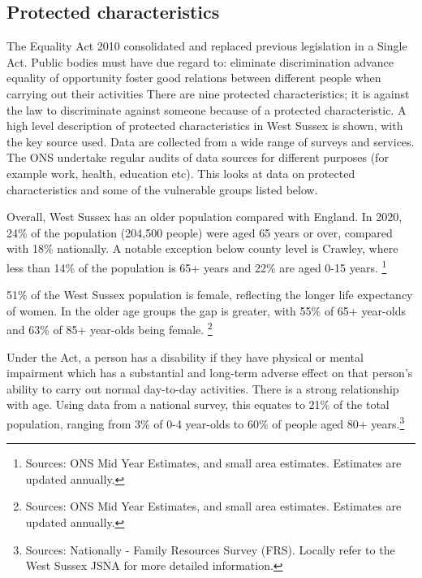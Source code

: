 \subsection{Protected characteristics}
The Equality Act 2010 consolidated and replaced previous legislation in a Single Act. Public bodies must have due regard to: eliminate discrimination advance equality of opportunity foster good relations between different people when carrying out their activities There are nine protected characteristics; it is against the law to discriminate against someone because of a protected characteristic. A high level description of protected characteristics in West Sussex is shown, with the key source used. Data are collected from a wide range of surveys and services. The ONS undertake regular audits of data sources for different purposes (for example work, health, education etc). This looks at data on protected characteristics and some of the vulnerable groups listed below.
\begin{tcolorbox}[title={Age}, colback={boxcolour}]
    \small Overall, West Sussex has an older population compared with England. In 2020, 24\% of the population (204,500 people) were aged 65 years or over, compared with 18\% nationally. A notable exception below county level is Crawley, where less than 14\% of the population is 65+ years and 22\% are aged 0-15 years. \footnote{Sources: ONS Mid Year Estimates, and small area estimates. Estimates are updated annually.}
\end{tcolorbox}
\begin{tcolorbox}[title={Sex}, colback={boxcolour}]
    \small 51\% of the West Sussex population is female, reflecting the longer life expectancy of women. In the older age groups the gap is greater, with 55\% of 65+ year-olds and 63\% of 85+ year-olds being female. \footnote{Sources: ONS Mid Year Estimates, and small area estimates. Estimates are updated annually.}
\end{tcolorbox}
\begin{tcolorbox}[title={Disability}, colback={boxcolour}]
    \small Under the Act, a person has a disability if they have physical or mental impairment which has a substantial and long-term adverse effect on that person's ability to carry out normal day-to-day activities. There is a strong relationship with age. Using data from a national survey, this equates to 21\% of the total population, ranging from 3\% of 0-4 year-olds to 60\% of people aged 80+ years.\footnote{Sources: Nationally - Family Resources Survey (FRS). Locally refer to the West Sussex JSNA for more detailed information.}
\end{tcolorbox}
